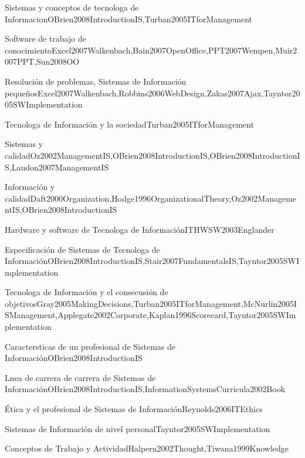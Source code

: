 \begin{LU1}{Sistemas y conceptos de tecnolog­a de Informacion}{OBrien2008IntroductionIS,Turban2005ITforManagement}{}
\begin{LU2}{Software de trabajo de conocimiento}{Excel2007Walkenbach,Bain2007OpenOffice,PPT2007Wempen,Muir2007PPT,Sun2008OO}{}
\begin{LU3}{Resolución de problemas, Sistemas de Información pequeños}{Excel2007Walkenbach,Robbins2006WebDesign,Zakas2007Ajax,Tayntor2005SWImplementation}{}
\begin{LU4}{Tecnolog­a de Información y la sociedad}{Turban2005ITforManagement}{}
\begin{LU5}{Sistemas y calidad}{Oz2002ManagementIS,OBrien2008IntroductionIS,OBrien2008IntroductionIS,Laudon2007ManagementIS}{}
\begin{LU6}{Información y calidad}{Daft2000Organization,Hodge1996OrganizationalTheory,Oz2002ManagementIS,OBrien2008IntroductionIS}{}
\begin{LU7}{Hardware y software de Tecnolog­a de Información}{ITHWSW2003Englander}{}
\begin{LU8}{Especificación de Sistemas de Tecnolog­a de Información}{OBrien2008IntroductionIS,Stair2007FundamentalsIS,Tayntor2005SWImplementation}{}
\begin{LU9}{Tecnolog­a de Información y el consecusión de objetivos}{Gray2005MakingDecisions,Turban2005ITforManagement,McNurlin2005ISManagement,Applegate2002Corporate,Kaplan1996Scorecard,Tayntor2005SWImplementation}{}
\begin{LU10}{Caracter­sticas de un profesional de Sistemas de Información}{OBrien2008IntroductionIS}{}
\begin{LU11}{L­nea de carrera de carrera de Sistemas de Información}{OBrien2008IntroductionIS,InformationSystemsCurricula2002Book}{}
\begin{LU12}{Ética y el profesional de Sistemas de Información}{Reynolds2006ITEthics}{}
\begin{LU13}{Sistemas de Información de nivel personal}{Tayntor2005SWImplementation}{}
\begin{LU13.01}[LU13]{Conceptos de Trabajo y Actividad}{Halpern2002Thought,Tiwana1999Knowledge}{}
\end{LU13.01}
\end{LU13}
\end{LU12}
\end{LU11}
\end{LU10}
\end{LU9}
\end{LU8}
\end{LU7}
\end{LU6}
\end{LU5}
\end{LU4}
\end{LU3}
\end{LU2}
\end{LU1}
